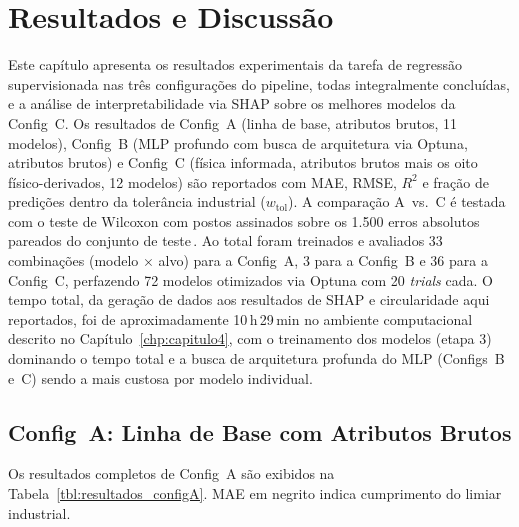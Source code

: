 \chapter{Resultados e Discussão}
\label{chp:resultados}

Este capítulo apresenta os resultados experimentais da tarefa de regressão supervisionada nas três configurações do pipeline, todas integralmente concluídas, e a análise de interpretabilidade via SHAP sobre os melhores modelos da Config~C. Os resultados de Config~A (linha de base, atributos brutos, 11 modelos), Config~B (MLP profundo com busca de arquitetura via Optuna, atributos brutos) e Config~C (física informada, atributos brutos mais os oito físico-derivados, 12 modelos) são reportados com MAE, RMSE, $R^2$ e fração de predições dentro da tolerância industrial ($w_\text{tol}$). A comparação A~vs.~C é testada com o teste de Wilcoxon com postos assinados sobre os 1.500 erros absolutos pareados do conjunto de teste\,\cite{demsar2006statistical}. Ao total foram treinados e avaliados 33 combinações (modelo $\times$ alvo) para a Config~A, 3 para a Config~B e 36 para a Config~C, perfazendo 72 modelos otimizados via Optuna com 20 \textit{trials} cada. O tempo total, da geração de dados aos resultados de SHAP e circularidade aqui reportados, foi de aproximadamente 10\,h\,29\,min no ambiente computacional descrito no Capítulo~\ref{chp:capitulo4}, com o treinamento dos modelos (etapa 3) dominando o tempo total e a busca de arquitetura profunda do MLP (Configs~B e~C) sendo a mais custosa por modelo individual.

\section{Config~A: Linha de Base com Atributos Brutos}
\label{sec:resultados-A}

Os resultados completos de Config~A são exibidos na Tabela~\ref{tbl:resultados_configA}. MAE em negrito indica cumprimento do limiar industrial.

